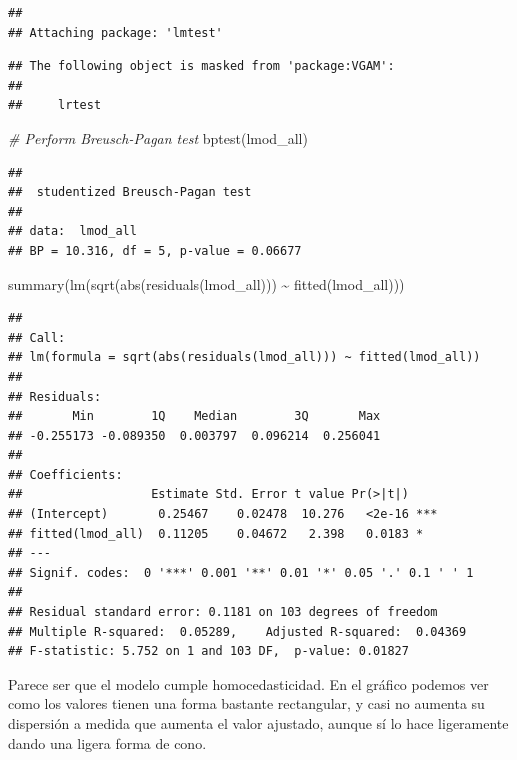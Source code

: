 \documentclass[
]{article}
\newenvironment{Shaded}{\begin{snugshade}}{\end{snugshade}}
\newcommand{\CommentTok}[1]{\textcolor[rgb]{0.56,0.35,0.01}{\textit{#1}}}
\newcommand{\FunctionTok}[1]{\textcolor[rgb]{0.00,0.00,0.00}{#1}}
\newcommand{\NormalTok}[1]{#1}
\newcommand{\SpecialCharTok}[1]{\textcolor[rgb]{0.00,0.00,0.00}{#1}}
\begin{document}
\begin{verbatim}
## 
## Attaching package: 'lmtest'
\end{verbatim}

\begin{verbatim}
## The following object is masked from 'package:VGAM':
## 
##     lrtest
\end{verbatim}

\begin{Shaded}
\begin{Highlighting}[]
\CommentTok{\# Perform Breusch{-}Pagan test}
\FunctionTok{bptest}\NormalTok{(lmod\_all)}
\end{Highlighting}
\end{Shaded}

\begin{verbatim}
## 
##  studentized Breusch-Pagan test
## 
## data:  lmod_all
## BP = 10.316, df = 5, p-value = 0.06677
\end{verbatim}

\begin{Shaded}
\begin{Highlighting}[]
\FunctionTok{summary}\NormalTok{(}\FunctionTok{lm}\NormalTok{(}\FunctionTok{sqrt}\NormalTok{(}\FunctionTok{abs}\NormalTok{(}\FunctionTok{residuals}\NormalTok{(lmod\_all))) }\SpecialCharTok{\textasciitilde{}} \FunctionTok{fitted}\NormalTok{(lmod\_all)))}
\end{Highlighting}
\end{Shaded}

\begin{verbatim}
## 
## Call:
## lm(formula = sqrt(abs(residuals(lmod_all))) ~ fitted(lmod_all))
## 
## Residuals:
##       Min        1Q    Median        3Q       Max 
## -0.255173 -0.089350  0.003797  0.096214  0.256041 
## 
## Coefficients:
##                  Estimate Std. Error t value Pr(>|t|)    
## (Intercept)       0.25467    0.02478  10.276   <2e-16 ***
## fitted(lmod_all)  0.11205    0.04672   2.398   0.0183 *  
## ---
## Signif. codes:  0 '***' 0.001 '**' 0.01 '*' 0.05 '.' 0.1 ' ' 1
## 
## Residual standard error: 0.1181 on 103 degrees of freedom
## Multiple R-squared:  0.05289,    Adjusted R-squared:  0.04369 
## F-statistic: 5.752 on 1 and 103 DF,  p-value: 0.01827
\end{verbatim}

Parece ser que el modelo cumple homocedasticidad. En el gráfico podemos
ver como los valores tienen una forma bastante rectangular, y casi no
aumenta su dispersión a medida que aumenta el valor ajustado, aunque sí
lo hace ligeramente dando una ligera forma de cono.
\end{document}
